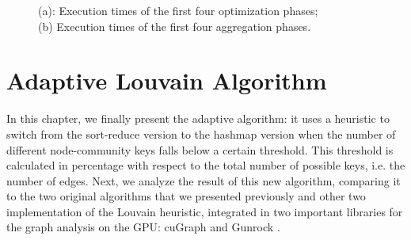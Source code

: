 \begin{figure}[t!]
	\caption{(a): Execution times of the first four optimization phases;\\(b) Execution times of the first four aggregation phases.}
\end{figure}
\newpage
\section{Adaptive Louvain Algorithm}\label{C7}
In this chapter, we finally present the adaptive algorithm: it uses a heuristic to switch from the sort-reduce version to the hashmap version when the number of different node-community keys falls below a certain threshold. This threshold is calculated in percentage with respect to the total number of possible keys, i.e. the number of edges. Next, we analyze the result of this new algorithm, comparing it to the two original algorithms that we presented previously and other two implementation of the Louvain heuristic, integrated in two important libraries for the graph analysis on the GPU: cuGraph \cite{cuGraph} and Gunrock \cite{gunrock}. 
